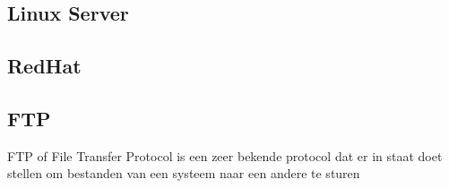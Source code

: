 \subsection{Linux Server}

\subsection{RedHat}

\subsection{FTP}
FTP of File Transfer Protocol is een zeer bekende protocol dat er in staat doet stellen om bestanden van een systeem naar een andere te sturen